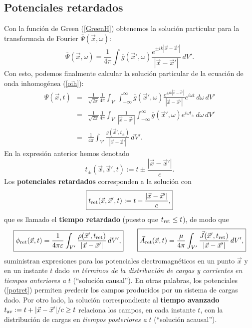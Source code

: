 \subsection{Potenciales retardados}
Con la función de Green (\ref{GreenH}) obtenemos la solución particular para la
transformada de Fourier $\bar{\Psi}(\vec{x},\omega)$:
\begin{equation}
\bar{\Psi}(\vec{x},\omega)=\frac{1}{4\pi}\int
\bar{g}(\vec{x}',\omega)\frac{e^{\pm
ik|\vec{x}-\vec{x}'|}}{|\vec{x}-\vec{x}'|}\,dV' .
\end{equation}
Con esto, podemos finalmente calcular la solución particular de la ecuación de
onda inhomogénea (\ref{oih}):
\begin{eqnarray}
\Psi(\vec{x},t)&=&\frac{1}{\sqrt{2\pi}}\frac{1}{4\pi}\int_{V'}\int_{-\infty}
^\infty \bar{g}(\vec{x}',\omega)\frac{e^{\pm
ik|\vec{x}-\vec{x}'|}}{|\vec{x}-\vec{x}'|}e^{i\omega t}\,d\omega\,dV'  \\
&=&\frac{1}{\sqrt{2\pi}}\frac{1}{4\pi}\int_{V'}\frac{1}{|\vec{x}-\vec{x}'|}\int_
{-\infty}^\infty \bar{g}(\vec{x}',\omega)e^{i\omega t_{\pm}}\,d\omega \,dV' \\
&=&\frac{1}{4\pi}\int_{V'} \frac{g(\vec{x}',t_{\pm})}{|\vec{x}-\vec{x}'|}\,dV' .
\end{eqnarray}
En la expresión anterior hemos denotado
\begin{equation}
t_{\pm}(\vec{x},\vec{x}',t):=t\pm \frac{|\vec{x}-\vec{x}'|}{c}.
\end{equation}
Los \textbf{potenciales retardados} corresponden a la solución con
\begin{equation}
\boxed{t_{\rm ret}(\vec{x},\vec{x}',t):=t-\frac{|\vec{x}-\vec{x}'|}{c},} \label{deftret}
\end{equation}
que es llamado el \textbf{tiempo retardado} (puesto que $t_{\rm ret}\le t$), de modo que
\begin{equation}
\boxed{\phi_{\rm ret}(\vec{x},t)=\frac{1}{4\pi\varepsilon}\int_{V'}
\frac{\rho(\vec{x}',t_{\rm ret})}{|\vec{x}-\vec{x}'|}\,dV',} \qquad \boxed{\vec{A}_{\rm
ret}(\vec{x},t)=\frac{\mu}{4\pi}\int_{V'}
\frac{\vec{J}(\vec{x}',t_{\rm ret})}{|\vec{x}-\vec{x}'|}\,dV' ,} \label{potret}
\end{equation}
suministran expresiones para los potenciales electromagnéticos en un punto
$\vec{x}$ y en un instante $t$ dado \textit{en términos de la distribución de cargas y corrientes en tiempos anteriores a} $t$ (``solución causal''). En otras palabras, los potenciales (\ref{potret}) permiten \textit{pre}decir los campos producidos por un sistema de cargas dado. Por otro lado, la solución correspondiente al \textbf{tiempo avanzado} $t_{\rm av}:=t+{|\vec{x}-\vec{x}'|}/{c}\ge t$ relaciona los campos, en cada instante $t$, con la distribución de cargas en \textit{tiempos posteriores a }$t$ (``solución acausal'').

